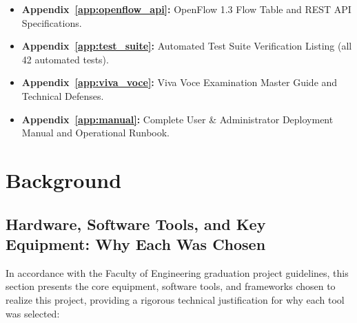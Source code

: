 \documentclass[12pt,a4paper,oneside]{report}
\begin{document}
\begin{itemize}
\begin{itemize}
        \item \textbf{Appendix~\ref{app:openflow_api}:} OpenFlow 1.3 Flow Table and REST API Specifications.
        \item \textbf{Appendix~\ref{app:test_suite}:} Automated Test Suite Verification Listing (all 42 automated tests).
        \item \textbf{Appendix~\ref{app:viva_voce}:} Viva Voce Examination Master Guide and Technical Defenses.
        \item \textbf{Appendix~\ref{app:manual}:} Complete User \& Administrator Deployment Manual and Operational Runbook.
    \end{itemize}
\end{itemize}

\chapter{Background}
\label{chap:background}

\section{Hardware, Software Tools, and Key Equipment: Why Each Was Chosen}
In accordance with the Faculty of Engineering graduation project guidelines, this section presents the core equipment, software tools, and frameworks chosen to realize this project, providing a rigorous technical justification for why each tool was selected:
\end{document}
